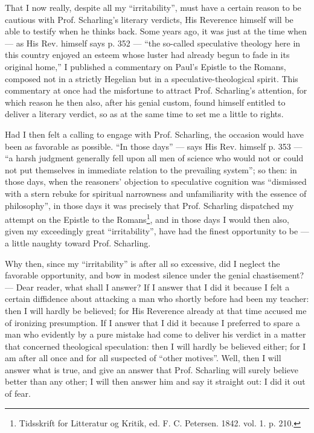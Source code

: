 \documentclass[12pt,a4paper,openany]{book}
\newcommand{\opage}[1]{\marginnote{\footnotesize\textit{[#1]}}}
\begin{document}
That I now really, despite all my ``irritability'', must have
a certain reason to be cautious with Prof. Scharling's
literary verdicts, His Reverence himself will be able to testify
when he thinks back. Some years ago, it
was just at the time when --- as His Rev. himself says
p. 352 --- ``the so-called speculative theology here in this country
enjoyed an esteem whose luster had already begun
to fade in its original home,'' I published a
commentary on Paul's Epistle to the Romans, composed not in a
strictly Hegelian but in a speculative-theological spirit. This commentary
at once had the misfortune to attract Prof. Scharling's
attention, for which reason he then also, after his genial
custom, found himself entitled to deliver a literary
verdict, so as at the same time to set me a little
to rights.

Had I then felt a calling to engage
with Prof. Scharling, the occasion would have been as favorable
as possible. ``In those days'' --- says His Rev. himself p.
\setcounter{footnote}{0}%
\opage{9}353 --- ``a harsh judgment generally fell upon all men of science
who would not or could not put themselves in
immediate relation to the prevailing system''; so then:
in those days, when the reasoners' objection to speculative
cognition was ``dismissed with a stern rebuke
for spiritual narrowness and unfamiliarity with
the essence of philosophy'', in those days it was precisely that Prof.
Scharling dispatched my attempt on the Epistle to the Romans\footnote[1]{Tidsskrift for Litteratur og Kritik, ed. F. C. Petersen. 1842. vol. 1. p. 210.},
and in those days I would then also, given my exceedingly
great ``irritability'', have had the finest opportunity to
be --- a little naughty toward Prof. Scharling.

Why then, since my ``irritability'' is after all
so excessive, did I neglect the favorable opportunity, and
bow in modest silence under the genial chastisement? --- Dear reader, what shall I answer? If I answer
that I did it because I felt a certain diffidence about
attacking a man who shortly before had been my teacher:
then I will hardly be believed; for His Reverence
already at that time accused me of ironizing presumption.
If I answer that I did it because I preferred to
spare a man who evidently by a pure mistake
had come to deliver his verdict in a matter that
concerned theological speculation: then I will hardly be believed
either; for I am after all once and for all suspected of ``other
motives''. Well, then I will answer what is true, and
give an answer that Prof. Scharling will surely believe better
than any other; I will then answer him and say it straight
out: I did it out of fear.
\end{document}
